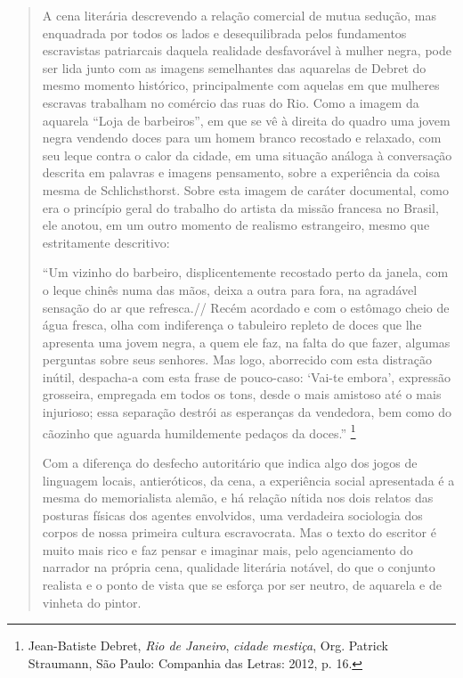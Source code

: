 \begin{quote}
A cena literária descrevendo a relação comercial de mutua sedução, mas
enquadrada por todos os lados e desequilibrada pelos fundamentos
escravistas patriarcais daquela realidade desfavorável à mulher negra,
pode ser lida junto com as imagens semelhantes das aquarelas de Debret
do mesmo momento histórico, principalmente com aquelas em que mulheres
escravas trabalham no comércio das ruas do Rio. Como a imagem da
aquarela ``Loja de barbeiros'', em que se vê à direita do quadro uma
jovem negra vendendo doces para um homem branco recostado e relaxado,
com seu leque contra o calor da cidade, em uma situação análoga à
conversação descrita em palavras e imagens pensamento, sobre a
experiência da coisa mesma de Schlichsthorst. Sobre esta imagem de
caráter documental, como era o princípio geral do trabalho do artista da
missão francesa no Brasil, ele anotou, em um outro momento de realismo
estrangeiro, mesmo que estritamente descritivo:

``Um vizinho do barbeiro, displicentemente recostado perto da janela,
com o leque chinês numa das mãos, deixa a outra para fora, na agradável
sensação do ar que refresca.// Recém acordado e com o estômago cheio de
água fresca, olha com indiferença o tabuleiro repleto de doces que lhe
apresenta uma jovem negra, a quem ele faz, na falta do que fazer,
algumas perguntas sobre seus senhores. Mas logo, aborrecido com esta
distração inútil, despacha-a com esta frase de pouco-caso: `Vai-te
embora', expressão grosseira, empregada em todos os tons, desde o mais
amistoso até o mais injurioso; essa separação destrói as esperanças da
vendedora, bem como do cãozinho que aguarda humildemente pedaços da
doces.'' \footnote{Jean-Batiste Debret, \emph{Rio de Janeiro},
  \emph{cidade mestiça}, Org. Patrick Straumann, São Paulo: Companhia
  das Letras: 2012, p. 16.}

Com a diferença do desfecho autoritário que indica algo dos jogos de
linguagem locais, antieróticos, da cena, a experiência social
apresentada é a mesma do memorialista alemão, e há relação nítida nos
dois relatos das posturas físicas dos agentes envolvidos, uma verdadeira
sociologia dos corpos de nossa primeira cultura escravocrata. Mas o
texto do escritor é muito mais rico e faz pensar e imaginar mais, pelo
agenciamento do narrador na própria cena, qualidade literária notável,
do que o conjunto realista e o ponto de vista que se esforça por ser
neutro, de aquarela e de vinheta do pintor.


\end{quote}
